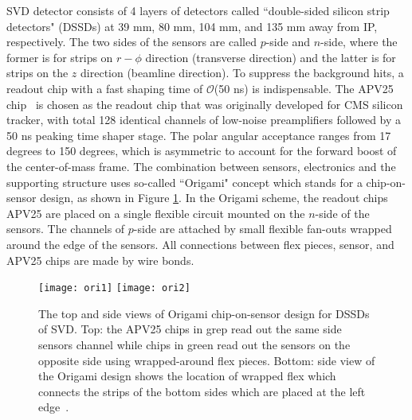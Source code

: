 SVD detector consists of 4 layers of detectors called  ``double-sided silicon strip detectors" (DSSDs) at 39 mm, 80 mm, 104 mm, and 135 mm away from IP, respectively. The two sides of the sensors are called $p$-side and $n$-side, where the former is for strips on $r-\phi$ direction (transverse direction) and the latter is for strips on the $z$ direction (beamline direction). To suppress the background hits, a readout chip with a fast shaping time of $\mathcal{O}$(50 ns) is indispensable. The APV25 chip~\cite{french2001design} is chosen as the readout chip that was originally developed for CMS silicon tracker, with total 128 identical channels of low-noise preamplifiers followed by a 50 ns peaking time shaper stage. The polar angular acceptance ranges from 17 degrees to 150 degrees, which is asymmetric to account for the
forward boost of the center-of-mass frame. The combination between sensors, electronics and the supporting structure uses so-called ``Origami" concept which stands for a chip-on-sensor design, as shown in Figure \ref{fig:origami}. In the Origami scheme, the readout chips APV25 are placed on a single flexible circuit mounted on the $n$-side of the sensors. The channels of $p$-side are attached by small flexible fan-outs wrapped around the edge of the sensors. All connections between flex pieces, sensor, and APV25 chips are made by wire bonds.
\begin{figure}[htpb]
	\centering
	\texttt{[image: ori1]}
	\texttt{[image: ori2]}
	\caption{The top and side views of Origami chip-on-sensor design for DSSDs of SVD. Top: the APV25 chips in grep read out the same side sensors channel while chips in green read out the sensors on the opposite side using wrapped-around flex pieces. Bottom: side view of the Origami design shows the location of wrapped flex which connects the strips of the bottom sides which are placed at the left edge~\cite{Abe:2010gxa}.}
	\label{fig:origami}
\end{figure}



